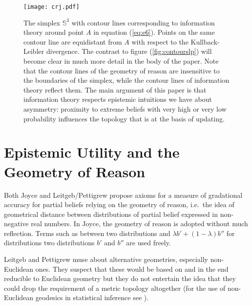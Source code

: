 \documentclass[11pt]{article}
\begin{document}
\begin{figure}[ht]
  \begin{flushright}
    \begin{minipage}[h]{.7\linewidth}
      \texttt{[image: crj.pdf]}
      \caption{\footnotesize The simplex $\mathbb{S}^{3}$ with contour
        lines corresponding to information theory around point $A$ in
        equation (\ref{eq:e6}). Points on the same contour line are
        equidistant from $A$ with respect to the Kullback-Leibler
        divergence. The contrast to figure (\ref{fig:contourslp}) will
        become clear in much more detail in the body of the paper.
        Note that the contour lines of the geometry of reason are
        insensitive to the boundaries of the simplex, while the
        contour lines of information theory reflect them. The main
        argument of this paper is that information theory respects
        epistemic intuitions we have about asymmetry: proximity to
        extreme beliefs with very high or very low probability
        influences the topology that is at the basis of updating.}
      \label{fig:contoursrj}
    \end{minipage}
  \end{flushright}
\end{figure}

\section{Epistemic Utility and the Geometry of Reason}
\label{eugr}

Both Joyce and Leitgeb/Pettigrew propose axioms for a measure of
gradational accuracy for partial beliefs relying on the geometry of
reason, i.e.\ the idea of geometrical distance between distributions
of partial belief expressed in non-negative real numbers. In Joyce,
the geometry of reason is adopted without much reflection. Terms such
as  between two distributions and
$\lambda{}b'+(1-\lambda)b''$ for distributions  two
distributions $b'$ and $b''$ are used freely.

Leitgeb and Pettigrew muse about alternative geometries, especially
non-Euclidean ones. They suspect that these would be based on and in
the end reducible to Euclidean geometry but they do not entertain the
idea that they could drop the requirement of a metric topology
altogether (for the use of non-Euclidean geodesics in statistical
inference see ). 
\end{document}
